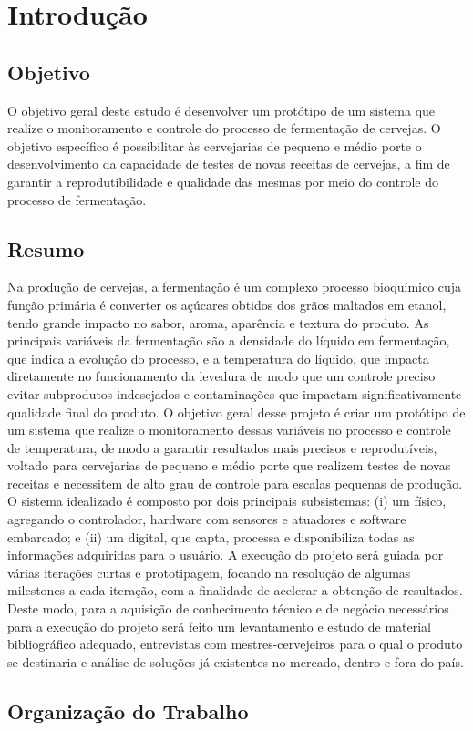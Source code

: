 \chapter{Introdução}

\section{Objetivo}

O objetivo geral deste estudo é desenvolver um protótipo de um sistema que realize o monitoramento e controle do processo de fermentação de cervejas.
O objetivo específico é possibilitar às cervejarias de pequeno e médio porte o desenvolvimento da capacidade de testes de novas receitas de cervejas, 
a fim de garantir a reprodutibilidade e qualidade das mesmas por meio do controle do processo de fermentação.

\section{Resumo}
Na produção de cervejas, a fermentação é um complexo processo bioquímico cuja função primária é converter os açúcares obtidos dos grãos maltados em etanol, tendo grande impacto no sabor, aroma, aparência e textura do produto. 
As principais variáveis da fermentação são a densidade do líquido em fermentação, que indica a evolução do processo, e a temperatura do líquido, que impacta diretamente no funcionamento da levedura de modo que um controle preciso evitar subprodutos indesejados e contaminações que impactam significativamente qualidade final do produto. 
O objetivo geral desse projeto é criar um protótipo de um sistema que realize o monitoramento dessas variáveis no processo e controle de temperatura, de modo a garantir resultados mais precisos e reprodutíveis, voltado para cervejarias de pequeno e médio porte que realizem testes de novas receitas e necessitem de alto grau de controle para escalas pequenas de produção. 
O sistema idealizado é composto por dois principais subsistemas: (i) um físico, agregando o controlador, hardware com sensores e atuadores e software embarcado; e (ii) um digital, que capta, processa e disponibiliza todas as informações adquiridas para o usuário. A execução do projeto será guiada por várias iterações curtas e prototipagem, focando na resolução de algumas milestones a cada iteração, com a finalidade de acelerar a obtenção de resultados.
Deste modo, para a aquisição de conhecimento técnico e de negócio necessários para a execução do projeto será feito um levantamento e estudo de material bibliográfico adequado, entrevistas com mestres-cervejeiros para o qual o produto se destinaria e análise de soluções já existentes no mercado, dentro e fora do país.


\section{Organização do Trabalho}


